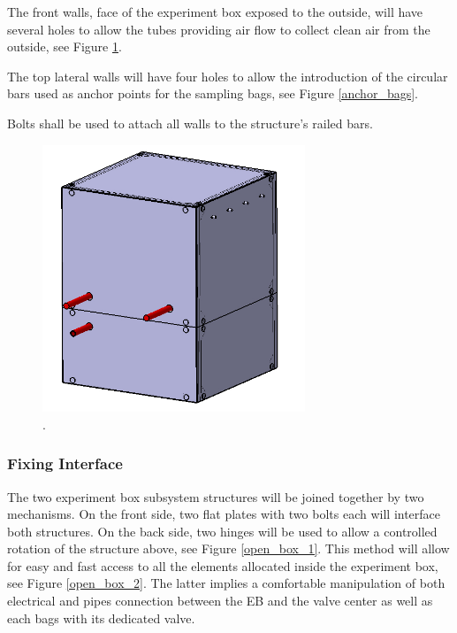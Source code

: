 \documentclass[a4paper,12pt,twoside]{article}
\providecommand{\DIFaddbegin}{} %
\providecommand{\DIFaddend}{} %
\newcommand{\DIFaddincludegraphics}[2][]{{\color{blue}\fbox{\DIFOincludegraphics[#1]{#2}}}} %
\DeclareRobustCommand{\DIFaddbegin}{\DIFOaddbegin \let\includegraphics\DIFaddincludegraphics} %
\DeclareRobustCommand{\DIFaddend}{\DIFOaddend \let\includegraphics\DIFOincludegraphics} %
\begin{document}
The front walls, face of the experiment box exposed to the outside, will have several holes to allow the tubes providing air flow to collect clean air from the outside, see Figure \ref{front_wall_holes}.

The top lateral walls will have four holes to allow the introduction of the circular bars used as anchor points for the sampling bags, see Figure \ref{anchor_bags}.

Bolts shall be used to attach all walls to the structure's railed bars.


\begin{figure}[!ht]
    \centering
    \includegraphics[width=0.7\textwidth]{4-experiment-design/img/frontal_holes.jpg}
    \caption{.}
    \label{front_wall_holes}
\end{figure}

\DIFaddbegin \pagebreak
\DIFaddend \subsubsection{Fixing Interface}

The two experiment box subsystem structures will be joined together by two mechanisms. On the front side, two flat plates with two bolts each will interface both structures. On the back side, two hinges will be used to allow a controlled rotation of the structure above, see Figure \ref{open_box_1}. This method will allow for easy and fast access to all the elements allocated inside the experiment box, see Figure \ref{open_box_2}. The latter implies a comfortable manipulation of both electrical and pipes connection between the EB and the valve center as well as each bags with its dedicated valve. 
\end{document}
